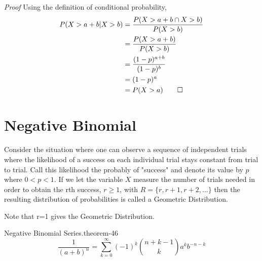 \documentclass[10pt,]{book}
\makeatletter
\renewcommand*{\proofname}{Proof}
\renewenvironment{proof}[1][\proofname]{\par
  \pushQED{\qed}%
  \normalfont \topsep6\p@\@plus6\p@\relax
  \trivlist
  \item\relax
    {\itshape
    #1\@addpunct{.}}\hspace\labelsep\ignorespaces
}{%
  \popQED\endtrivlist\@endpefalse
}
\numberwithin{equation}{section}
\newcommand{\lt}{<}
\makeatother
\begin{document}
\begin{proof}\hypertarget{proof-47}{}
\hypertarget{p-953}{}%
Using the definition of conditional probability,%
\begin{align*}
P( X > a + b | X > b ) & = \frac{P( X > a + b \cap X > b )}{P( X > b)}\\
& = \frac{P( X > a + b )}{P( X > b)}\\
& = \frac{(1-p)^{a+b}}{(1-p)^b}\\
& = (1-p)^a\\
& = P(X > a)\qedhere
\end{align*}
%
\end{proof}
%
%
%
\typeout{************************************************}
\typeout{************************************************}
%
\section[{Negative Binomial}]{Negative Binomial}\label{section-48}
\hypertarget{p-954}{}%
Consider the situation where one can observe a sequence  of independent trials where the likelihood of a success on each individual trial stays constant from trial to trial. Call this likelihood the probably of "success" and denote its value by \(p\) where \(0 \lt p \lt 1 \). If we let the variable \(X\) measure the number of trials needed in order to obtain the rth success, \(r \ge 1\), with \(R = \{r, r+1, r+2, ... \}\) then the resulting distribution of probabilities is called a Geometric Distribution.%
\par
\hypertarget{p-955}{}%
Note that r=1 gives the Geometric Distribution.%
\par
\hypertarget{p-956}{}%
\begin{theorem}{Negative Binomial Series.}{}{theorem-46}%
\hypertarget{p-957}{}%
%
\begin{equation*}
\displaystyle \frac{1}{(a+b)^n} = \sum_{k=0}^{\infty} {(-1)^k \binom{n + k - 1}{k} a^k b^{-n-k}}
\end{equation*}
%
\end{theorem}
\end{document}
